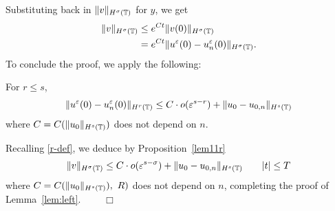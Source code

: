 Substituting back in $\|v\|_{H^{\sigma}(\mathbb{T})}$ for $y$, we get
\begin{equation*}
\begin{split}
\|v\|_{H^{\sigma}(\mathbb{T})}
& \le e^{C t}\|v(0)\|_{H^{\sigma}(\mathbb{T})}
\\
& = e^{C t}\|u^\varepsilon(0) - u^\varepsilon_n(0) \|_{H^{\sigma}(\mathbb{T})}.
\end{split}
\end{equation*}
To conclude the proof, we apply the following:
\begin{proposition}
\label{lem11r}
For $r \le s$,
\begin{equation}
\begin{split}
\|u^\varepsilon(0) - u_n^\varepsilon (0) \|_{H^r(\mathbb{T})} \le C
\cdot o(\varepsilon^{s-r}) + \|u_0 - u_{0,n} \|_{H^s(\mathbb{T})}
\label{3w}
\end{split}
\end{equation}
where $C=C(\|u_0\|_{H^s(\mathbb{T})})$ does not depend on $n$.
\end{proposition}
%
%
Recalling \eqref{r-def}, we deduce by Proposition~\ref{lem11r}
\begin{equation*}
\begin{split}
\|v\|_{H^{\sigma}(\mathbb{T})} \le C \cdot o(\varepsilon^{s - \sigma}) + \|u_0 -
u_{0,n} \|_{H^s(\mathbb{T})} \qquad |t| \le T
\end{split}
\end{equation*}
where $C=C(\|u_0\|_{H^s(\mathbb{T})}), \ R)$ does not depend
on $n$, completing the proof of Lemma~\ref{lem:left}. $\qquad \Box$
%
%
